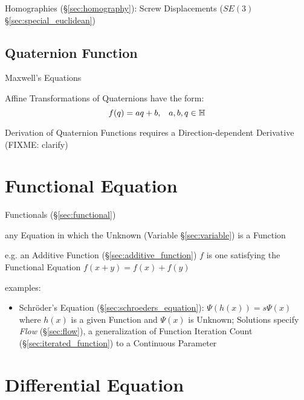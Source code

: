 Homographies (\S\ref{sec:homography}): Screw Displacements ($SE(3)$
\S\ref{sec:special_euclidean})



\subsection{Quaternion Function}\label{sec:quaternion_function}

Maxwell's Equations

Affine Transformations of Quaternions have the form:
\[
  f(q) = aq + b, \;\;\; a,b,q \in \mathbb{H}
\]

Derivation of Quaternion Functions requires a Direction-dependent Derivative
(FIXME: clarify)



\section{Functional Equation}\label{sec:functional_equation}


Functionals (\S\ref{sec:functional})

any Equation in which the Unknown (Variable \S\ref{sec:variable}) is a Function

e.g. an Additive Function (\S\ref{sec:additive_function}) $f$ is one satisfying
the Functional Equation $f(x + y) = f(x) + f(y)$


examples:
\begin{itemize}
  \item Schr\"oder's Equation (\S\ref{sec:schroeders_equation}): $\Psi(h(x)) =
    s\Psi(x)$ where $h(x)$ is a given Function and $\Psi(x)$ is Unknown;
    Solutions specify \emph{Flow} (\S\ref{sec:flow}), a generalization of
    Function Iteration Count (\S\ref{sec:iterated_function}) to a Continuous
    Parameter
\end{itemize}



\section{Differential Equation}\label{sec:differential_equation}

